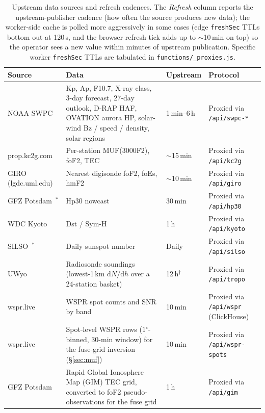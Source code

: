 \documentclass[11pt,a4paper]{article}
\newcommand{\degree}{\ensuremath{{}^\circ}}
\begin{document}
\begin{table}[H]
\centering
\small
\caption{Upstream data sources and refresh cadences.  The
\emph{Refresh} column reports the upstream-publisher cadence (how
often the source produces new data); the worker-side cache is
polled more aggressively in some cases (edge \texttt{freshSec}
TTLs bottom out at 120\,s, and the browser refresh tick adds up
to ${\sim}$10\,min on top) so the operator sees a new value
within minutes of upstream publication.  Specific
worker \texttt{freshSec} TTLs are tabulated in
\texttt{functions/\_proxies.js}.}
\label{tab:sources}
\begin{tabular}{@{}p{2.7cm}p{6.6cm}p{1.6cm}p{3.6cm}@{}}
\toprule
\textbf{Source} & \textbf{Data} & \textbf{Upstream} & \textbf{Protocol} \\
\midrule
NOAA SWPC
  & Kp, Ap, F10.7, X-ray class, 3-day forecast, 27-day outlook,
    D-RAP HAF, OVATION aurora HP, solar-wind Bz / speed / density,
    solar regions
  & 1\,min--6\,h & Proxied via \texttt{/api/swpc-*} \\
\addlinespace
prop.kc2g.com~\cite{kc2g} & Per-station MUF(3000F2), foF2, TEC & ${\sim}$15\,min & Proxied via \texttt{/api/kc2g} \\
\addlinespace
GIRO (lgdc.uml.edu)~\cite{giro} & Nearest digisonde foF2, foEs, hmF2 & ${\sim}$10\,min & Proxied via \texttt{/api/giro} \\
\addlinespace
GFZ Potsdam~\cite{hp30}$^{*}$ & Hp30 nowcast & 30\,min & Proxied via \texttt{/api/hp30} \\
\addlinespace
WDC Kyoto~\cite{wdckyoto} & Dst / Sym-H & 1\,h & Proxied via \texttt{/api/kyoto} \\
\addlinespace
SILSO~\cite{silso}$^{*}$ & Daily sunspot number & Daily & Proxied via \texttt{/api/silso} \\
\addlinespace
UWyo~\cite{uwyo} & Radiosonde soundings (lowest-1\,km $\mathrm{d}N/\mathrm{d}h$ over a 24-station basket) & 12\,h$^{\dagger}$ & Proxied via \texttt{/api/tropo} \\
\addlinespace
wspr.live~\cite{wsprlive} & WSPR spot counts and SNR by band & 10\,min & Proxied via \texttt{/api/wspr} (ClickHouse) \\
\addlinespace
wspr.live~\cite{wsprlive} & Spot-level WSPR rows ($1\degree$-binned, 30-min window) for the fuse-grid inversion (\S\ref{sec:muf}) & 10\,min & Proxied via \texttt{/api/wspr-spots} \\
\addlinespace
GFZ Potsdam & Rapid Global Ionosphere Map (GIM) TEC grid, converted to foF2 pseudo-observations for the fuse grid & 1\,h & Proxied via \texttt{/api/gim} \\

\end{tabular}
\end{table}
\end{document}
